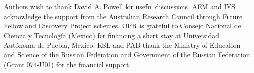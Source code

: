 \documentclass[twoside,twocolumn,9pt]{article}
\begin{document}
  Authors wish to thank David A. Powell for useful discussions.  AEM and IVS acknowledge the support from the Australian Research Council through Future Fellow and Discovery
  Project schemes. OPR is grateful to Consejo Nacional de Ciencia y
  Tecnolog\'{i}a (Mexico) for financing a short stay at Universidad
  Autónoma de Puebla, Mexico.  KSL and PAB thank the Ministry of
  Education and Science of the Russian Federation and Government of
  the Russian Federation (Grant 074-U01) for the financial support.











\balance


\scriptsize{

 } %
\end{document}
